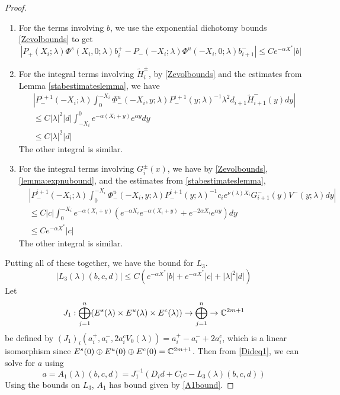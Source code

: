 \documentclass[thesis.tex]{subfiles}
\begin{document}
\begin{lemma}
\begin{proof}
\begin{enumerate}
\item For the terms involving $b$, we use the exponential dichotomy bounds \eqref{Zevolbounds} to get
\[
| P_+(X_i; \lambda)\Phi^s(X_i, 0; \lambda) b_i^+ - P_-(-X_i; \lambda) \Phi^u(-X_i, 0; \lambda) b_{i+1}^-| \leq C e^{-\alpha X^*} |b|
\]
\item For the integral terms involving $\tilde{H}_i^\pm$, by \eqref{Zevolbounds} and the estimates from Lemma \ref{stabestimateslemma}, we have
\begin{align*}
&\left|
P^{i+1}_-(-X_i; \lambda) \int_0^{-X_i} \Phi^u_-(-X_i, y; \lambda) P^{i+1}_-(y; \lambda)^{-1} \lambda^2 d_{i+1} \tilde{H}_{i+1}^-(y) dy \right| \\
& \leq C |\lambda|^2 |d| \int_{-X_i}^0 e^{-\alpha(X_i + y)} e^{\alpha y} dy \\
& \leq C |\lambda|^2 |d|
\end{align*}
The other integral is similar.

\item For the integral terms involving $G_i^\pm(x)$, we have by \eqref{Zevolbounds}, \cref{lemma:expnubound}, and the estimates from \cref{stabestimateslemma},
\begin{align*}
&\left|
P^{i+1}_-(-X_i; \lambda) \int_0^{-X_i} \Phi^u_-(-X_i, y; \lambda) P^{i+1}_-(y; \lambda)^{-1} c_i e^{\nu(\lambda)X_i} G_{i+1}^-(y) V^-(y; \lambda) dy \right| \\
&\leq C |c| \int_0^{-X_i} e^{-\alpha(X_i + y)} \left( e^{-\alpha X_i} e^{-\alpha(X_i + y) } + e^{-2 \alpha X_i} e^{\alpha y} \right) dy \\
&\leq C e^{-\alpha X^*} |c| 
\end{align*}
The other integral is similar.
\end{enumerate}

Putting all of these together, we have the bound for $L_3$.
\begin{equation}\label{L3bound}
|L_3(\lambda)(b, c, d)| \leq C \left( e^{-\alpha X^*} |b| + e^{-\alpha X^*} |c| + |\lambda|^2 |d| \right)
\end{equation}
Let 
\[
J_1: \bigoplus_{j=1}^n (E^s(\lambda) \times E^u(
\lambda) \times E^c(\lambda) ) \rightarrow \bigoplus_{j=1}^n \rightarrow \mathbb{C}^{2m+1}
\]
be defined by $(J_1)_i(a_i^+, a_i^-, 2 a_i^c V_0(\lambda)) = a_i^+ - a_i^- + 2 a_i^c$, which is a linear isomorphism since $E^s(0) \oplus E^u(0) \oplus E^c(0) = \mathbb{C}^{2m+1}$. Then from \cref{Dideq1}, we can solve for $a$ using  
\[
a = A_1(\lambda)(b, c, d) = J_1^{-1} \left(D_i d + C_i c - L_3(\lambda)(b, c, d)\right)
\]
Using the bounds on $L_3$, $A_1$ has bound given by \cref{A1bound}.
\end{proof}
\end{lemma}
\end{document}
